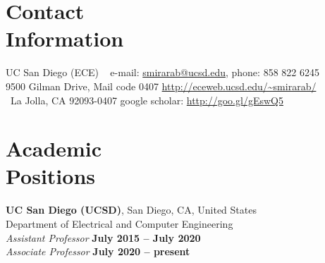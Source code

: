 \documentclass[margin,line,letterpaper]{resume}
\begin{document}
\begin{resume}

    \section{\mysidestyle Contact\\Information}
UC San Diego (ECE)  ~ \hfill e-mail: \url{smirarab@ucsd.edu},	phone: 858 822 6245   \vspace{0mm}\\\vspace{0mm} 
   9500 Gilman Drive, Mail code 0407  \hfill  \url{http://eceweb.ucsd.edu/~smirarab/}\vspace{0mm}\\\vspace{-4.5mm}%
   ~La Jolla, CA 92093-0407   	\hfill google scholar: \url{http://goo.gl/gEswQ5} \vspace{0mm}\\\vspace{-1.5mm}
   
      
    \section{\mysidestyle Academic\\Positions}

    \textbf{UC San Diego (UCSD)}, San Diego, CA, United States\\
    Department of Electrical and Computer Engineering\vspace{1mm}\\\vspace{0mm}%
    \textsl{Assistant Professor} \hfill \textbf{ July 2015 -- July 2020}\vspace{0mm}\\%
        \textsl{Associate Professor} \hfill \textbf{ July 2020 -- present}\vspace{-3mm}\\\vspace{-4mm}%

\end{resume}
\end{document}
